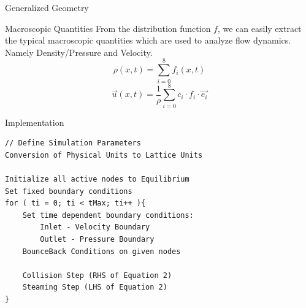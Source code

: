 \documentclass[
    a0paper, %
    landscape, %
    fontscale=0.34 %
    ]{baposter}
\newcommand{\beqs}{\begin{equation*}}
\newcommand{\eeqs}{\end{equation*}}
\newcommand{\of}[1]{\left(#1\right)}
\begin{document}
\begin{poster}
\begin{posterbox}[name=geometry,span=4,column=2,row=0]{Generalized Geometry}
\begin{center}
\raisebox{-0.5\height}{\hspace{0.5cm}$\longrightarrow$}%
%
\raisebox{-0.5\height}{\hspace{0.5cm}$\longrightarrow$\hspace{0.2cm}}%
\end{center}
\end{posterbox}


\begin{posterbox}[name=equations,column=3,span=1, below=geometry]{Macroscopic Quantities}
From the distribution function $f$,  we can easily extract the typical macroscopic quantities which are used to analyze flow dynamics. Namely Density/Pressure and Velocity.
\beqs \rho\of{x,t} = \sum_{i=0}^8 f_i \of{x,t} \eeqs
\beqs \vec{u}\of{x,t} = \frac{1}{\rho}\sum_{i=0}^8 c_i \cdot f_i \cdot \vec{e_i} \eeqs 
\end{posterbox}


\begin{posterbox}[name=code,column=2,span=1, below=geometry, bottomaligned = equations]{Implementation}
\scriptsize
\begin{verbatim}
// Define Simulation Parameters
Conversion of Physical Units to Lattice Units

Initialize all active nodes to Equilibrium
Set fixed boundary conditions
for ( ti = 0; ti < tMax; ti++ ){
    Set time dependent boundary conditions:
        Inlet - Velocity Boundary 
        Outlet - Pressure Boundary 
    BounceBack Conditions on given nodes
	
    Collision Step (RHS of Equation 2)
    Steaming Step (LHS of Equation 2)
}	
\end{verbatim}
\end{posterbox}



\end{poster}
\end{document}
